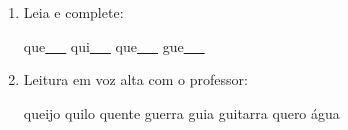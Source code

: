 \begin{exercicio}
\begin{enumerate}[resume]
\begin{enumerate}[label=(\alph*)]
    \item O som da unidade é: ( ) oral ( ) nasal 

    \item A primeira sílaba de QUEIJO é: ( ) QUE ( ) QUI

    \item As palavras da unidade aparecem: ( ) no início ( ) no meio ( ) no fim das palavras

  \end{enumerate}

  \item Leia e complete:
  \begin{center}
  que\underline{~~~} \quad qui\underline{~~~} \quad que\underline{~~~} \quad gue\underline{~~~}
  \end{center}

  \item Leitura em voz alta com o professor:
  \begin{center}
  queijo \quad quilo \quad quente \quad guerra \quad guia \quad guitarra \quad quero \quad água
  \end{center}

\end{enumerate}

\end{exercicio}



